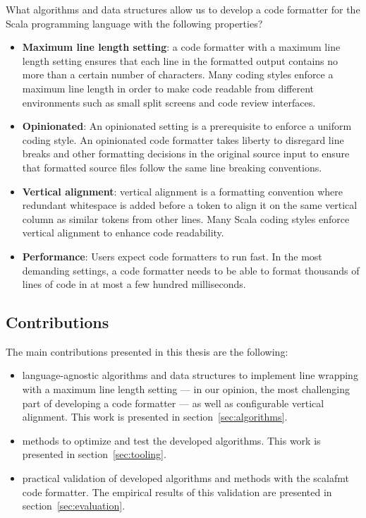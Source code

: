 What algorithms and data structures allow us to develop a code formatter for the Scala programming language with the following properties?
\begin{itemize}
  \item \textbf{Maximum line length setting}: a code formatter with a maximum line length setting ensures that each line in the formatted output contains no more than a certain number of characters.
    Many coding styles enforce a maximum line length in order to make code readable from different environments such as small split screens and code review interfaces.
  \item \textbf{Opinionated}:
    An opinionated setting is a prerequisite to enforce a uniform coding style.
    An opinionated code formatter takes liberty to disregard line breaks and other formatting decisions in the original source input to ensure that formatted source files follow the same line breaking conventions.
  \item \textbf{Vertical alignment}: vertical alignment is a formatting convention where redundant whitespace is added before a token to align it on the same vertical column as similar tokens from other lines. Many Scala coding styles enforce vertical alignment to enhance code readability.
  \item \textbf{Performance}: Users expect code formatters to run fast.
    In the most demanding settings, a code formatter needs to be able to format thousands of lines of code in at most a few hundred milliseconds.

\end{itemize}

\subsection{Contributions}
The main contributions presented in this thesis are the following:
\begin{itemize}
  \item language-agnostic algorithms and data structures to implement line
    wrapping with a maximum line length setting --- in our opinion, the most
    challenging part of developing a code formatter --- as well as configurable
    vertical alignment.
    This work is presented in section~\ref{sec:algorithms}.
  \item methods to optimize and test the developed algorithms.
    This work is presented in section~\ref{sec:tooling}.
  \item practical validation of developed algorithms and methods with the scalafmt code formatter.
    The empirical results of this validation are presented in section~\ref{sec:evaluation}.
\end{itemize}
